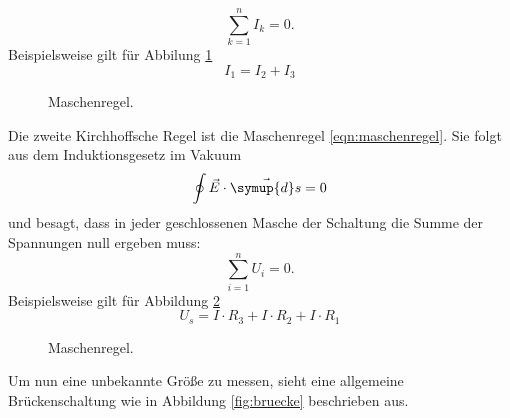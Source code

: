 \begin{equation}
  \sum_{k=1}^n I_k = 0.
  \label{eqn:knotenregel}
\end{equation}
Beispielsweise gilt für Abbilung \ref{fig:knotenregel}
\begin{equation}
I_1 = I_2 + I_3
\end{equation}
\begin{figure}[H]
  \centering
  \caption{Maschenregel.}
  \label{fig:knotenregel}
\end{figure}
Die zweite Kirchhoffsche Regel ist die Maschenregel \eqref{eqn:maschenregel}.
Sie folgt aus dem Induktionsgesetz im Vakuum
\begin{equation}
\oint \vec{E} \cdot \vec{\symup{d}s} = 0
\end{equation}
und besagt, dass in jeder geschlossenen Masche der Schaltung die Summe der Spannungen null ergeben muss:
\begin{equation}
  \sum_{i=1}^n U_i = 0.
  \label{eqn:maschenregel}
\end{equation}
Beispielsweise gilt für Abbildung \ref{fig:maschenregel}
\begin{equation}
U_s = I \cdot R_3 + I \cdot R_2 + I \cdot R_1
\end{equation}
\begin{figure}[H]
  \centering
    \caption{Maschenregel.}
    \label{fig:maschenregel}
\end{figure}

Um nun eine unbekannte Größe zu messen, sieht eine allgemeine Brückenschaltung wie in Abbildung \ref{fig:bruecke} beschrieben aus.

